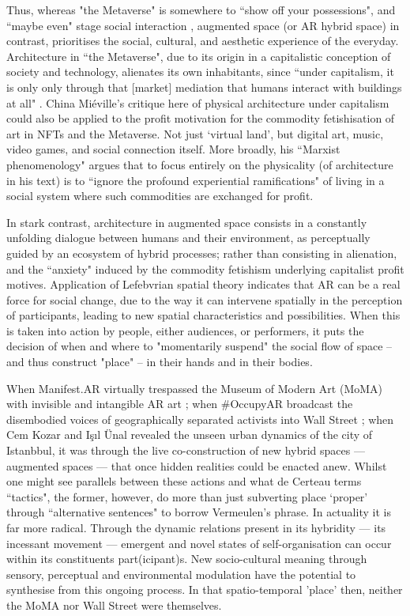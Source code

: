 Thus, whereas "the Metaverse" is somewhere to ``show off your possessions", and ``maybe even" stage social interaction \citep{marr2022}, augmented space (or AR hybrid space) in contrast, prioritises the social, cultural, and aesthetic experience of the everyday. Architecture in ``the Metaverse", due to its origin in a capitalistic conception of society and technology, alienates its own inhabitants, since ``under capitalism, it is only only through that [market] mediation that humans interact with buildings at all" \citep[p. 18]{mieville1998}. China Miéville's critique here of physical architecture under capitalism could also be applied to the profit motivation for the commodity fetishisation of art in NFTs and the Metaverse. Not just `virtual land', but digital art, music, video games, and social connection itself. More broadly, his ``Marxist phenomenology" argues that to focus entirely on the physicality (of architecture in his text) is to ``ignore the profound experiential ramifications" of living in a social system where such commodities are exchanged for profit. 

In stark contrast, architecture in augmented space consists in a constantly unfolding dialogue between humans and their environment, as perceptually guided by an ecosystem of hybrid processes; rather than consisting in alienation, and the ``anxiety" induced by the commodity fetishism underlying capitalist profit motives. Application of Lefebvrian spatial theory indicates that AR can be a real force for social change, due to the way it can intervene spatially in the perception of participants, leading to new spatial characteristics and possibilities. When this is taken into action by people, either audiences, or performers, it puts the decision of when and where to "momentarily suspend" the social flow of space -- and thus construct "place" -- in their hands and in their bodies.

When Manifest.AR virtually trespassed the Museum of Modern Art (MoMA) with invisible and intangible AR art \citep{veenhof2010}; when \#OccupyAR broadcast the disembodied voices of geographically separated activists into Wall Street \citep{skwarek2018}; when Cem Kozar and Işıl Ünal \citeyearpar{thiel2011,thiel2018} revealed the unseen urban dynamics of the city of Istanbbul, it was through the live co-construction of new hybrid spaces — augmented spaces — that once hidden realities could be enacted anew. Whilst one might see parallels between these actions and what de Certeau terms ``tactics", the former, however, do more than just subverting place `proper' through ``alternative sentences" to borrow Vermeulen's phrase. In actuality it is far more radical. Through the dynamic relations present in its hybridity — its incessant movement — emergent and novel states of self-organisation can occur within its constituents part(icipant)s. New socio-cultural meaning through sensory, perceptual and environmental modulation have the potential to synthesise from this ongoing process. In that spatio-temporal 'place' then, neither the MoMA nor Wall Street were themselves.

